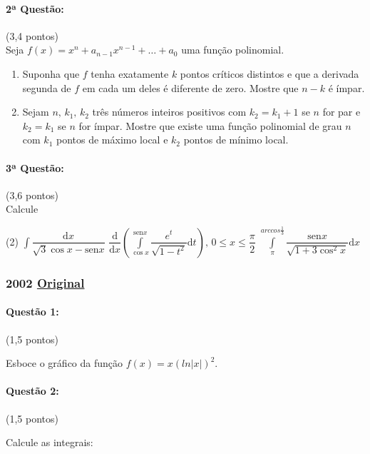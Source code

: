 \documentclass[12pt,a4paper]{article}
\newcommand{\modu}[1]{\vert #1 \vert}
\newcommand{\sen}{\mathrm{sen}}
\newcommand{\dd}{\mathrm{d}}
\newcommand{\intin}{\displaystyle\int}
\newcommand{\intdef}[2]{\displaystyle\int\limits_{#1}^{#2}}
\newcommand{\original}[1]{\tiny \href{#1}{Original} \normalsize}
\begin{document}
\paragraph{2ª Questão: }(3,4 pontos)\\
Seja $f(x) = x^n + a_{n-1}x^{n-1} + \dots + a_0$ uma função polinomial.

\begin{enumerate}[label=(\alph*)]
\item Suponha que $f$ tenha exatamente $k$ pontos críticos distintos e que a derivada segunda de $f$ em cada um deles é diferente de zero. Mostre que $n-k$ é ímpar.
\item Sejam $n, \, k_1, \, k_2$ três números inteiros positivos com $k_2 = k_1 + 1$ se $n$ for par e $k_2 = k_1$ se $n$ for ímpar. Mostre que existe uma função polinomial de grau $n$ com $k_1$ pontos de máximo local e $k_2$ pontos de mínimo local.
\end{enumerate}

\paragraph{3ª Questão: }(3,6 pontos)\\
Calcule
\begin{tasks}(2)
\task $\intin \dfrac{\dd x}{\sqrt{3}\cos x - \sen x}$
\task $\dfrac{\dd}{\dd x}\left( \intdef{\cos x}{\sen x} \dfrac{e^t}{\sqrt{1-t^2}} \dd t \right), \,0\le x \le \dfrac{\pi}{2}$
\task $\intdef{\pi}{arccos\frac{1}{3}} \dfrac{\sen x}{\sqrt{1+3\cos ^2 x}} \dd x$
\end{tasks}


\newpage

\subsubsection{2002 \original{https://drive.google.com/open?id=1e1hz898KCWAUG7D1JYyGIJyk3Alai4J6}}

\paragraph{Questão 1:} (1,5 pontos)

Esboce o gráfico da função $f(x)=x(ln\modu{x})^2$.

\paragraph{Questão 2:} (1,5 pontos)

Calcule as integrais:
\end{document}
